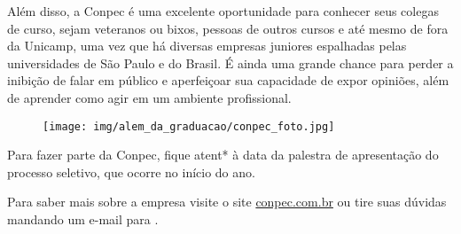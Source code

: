 Além disso, a Conpec é uma excelente oportunidade para conhecer seus colegas de curso,
sejam veteranos ou bixos, pessoas de outros cursos e até mesmo
de fora da Unicamp, uma vez que há diversas empresas juniores espalhadas pelas
universidades de São Paulo e do Brasil. É ainda uma grande
chance para perder a inibição de falar em público e aperfeiçoar sua capacidade de expor
opiniões, além de aprender como agir em um ambiente profissional.

\begin{figure}[H]
    \centering
    \texttt{[image: img/alem\_da\_graduacao/conpec\_foto.jpg]}
\end{figure}

Para fazer parte da Conpec, fique atent* à data da palestra de apresentação do
processo seletivo, que ocorre no início do ano.

Para saber mais sobre a empresa visite o site \url{conpec.com.br} ou tire suas
dúvidas mandando um e-mail para .

